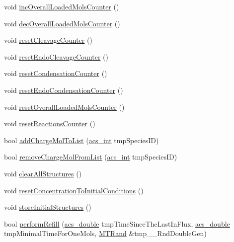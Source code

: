 \begin{DoxyCompactItemize}
\item 
void \hyperlink{classenvironment_a719b14624d9a2f891b8d4eb47649a00e}{inc\-Overall\-Loaded\-Mols\-Counter} ()
\item 
void \hyperlink{classenvironment_a6686b0489ed94f11c4b03c011978f9af}{dec\-Overall\-Loaded\-Mols\-Counter} ()
\item 
void \hyperlink{classenvironment_a0b1e324c651c86cb54279e022c14dc6d}{reset\-Cleavage\-Counter} ()
\item 
void \hyperlink{classenvironment_a3362d147de095640619d9b44f7f20bba}{reset\-Endo\-Cleavage\-Counter} ()
\item 
void \hyperlink{classenvironment_ac7deab8db2f581077da735c3542d8f1b}{reset\-Condensation\-Counter} ()
\item 
void \hyperlink{classenvironment_a55cff0bc2f8de4d3e4db471cad580a86}{reset\-Endo\-Condensation\-Counter} ()
\item 
void \hyperlink{classenvironment_abc04de785dddab4703fdcf52ccdf85f9}{reset\-Overall\-Loaded\-Mols\-Counter} ()
\item 
void \hyperlink{classenvironment_a5c8713237992b28c39199a7aea3f9ea0}{reset\-Reactions\-Counter} ()
\item 
bool \hyperlink{classenvironment_a7981c34d16c0b1e9e6ca3ea69aa3a8a3}{add\-Charge\-Mol\-To\-List} (\hyperlink{acs__headers_8h_a8d277355641a098190360234e2ebde35}{acs\-\_\-int} tmp\-Species\-I\-D)
\item 
bool \hyperlink{classenvironment_aa4830018af0b99eddefcdefad877b305}{remove\-Charge\-Mol\-From\-List} (\hyperlink{acs__headers_8h_a8d277355641a098190360234e2ebde35}{acs\-\_\-int} tmp\-Species\-I\-D)
\item 
void \hyperlink{classenvironment_aa860227725dbe5b0251a25f440773161}{clear\-All\-Structures} ()
\item 
void \hyperlink{classenvironment_a97305e36924f19e72bfc1c3d89e45931}{reset\-Concentration\-To\-Initial\-Conditions} ()
\item 
void \hyperlink{classenvironment_a7fc3937fb586db93c33f7f091dc99626}{store\-Initial\-Structures} ()
\item 
bool \hyperlink{classenvironment_a8a53821ad1675b0da50591616aac3b74}{perform\-Refill} (\hyperlink{acs__headers_8h_ab776853a005fcbf56af0424a2a4dd607}{acs\-\_\-double} tmp\-Time\-Since\-The\-Last\-In\-Flux, \hyperlink{acs__headers_8h_ab776853a005fcbf56af0424a2a4dd607}{acs\-\_\-double} tmp\-Minimal\-Time\-For\-One\-Mols, \hyperlink{class_m_t_rand}{M\-T\-Rand} \&tmp\-\_\-\-\_\-\-Rnd\-Double\-Gen)
\item 

\end{DoxyCompactItemize}
